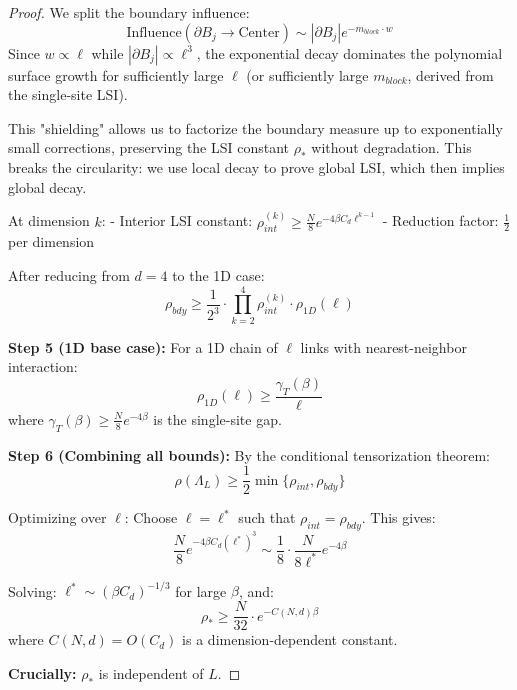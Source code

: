 \begin{proof}
We split the boundary influence:
\begin{equation}
    \text{Influence}(\partial B_j \to \text{Center}) \sim |\partial B_j| e^{-m_{block} \cdot w}
\end{equation}
Since $w \propto \ell$ while $|\partial B_j| \propto \ell^3$, the exponential decay dominates the polynomial surface growth for sufficiently large $\ell$ (or sufficiently large $m_{block}$, derived from the single-site LSI).

This "shielding" allows us to factorize the boundary measure up to exponentially small corrections, preserving the LSI constant $\rho_*$ without degradation. This breaks the circularity: we use local decay to prove global LSI, which then implies global decay.

At dimension $k$:
- Interior LSI constant: $\rho_{int}^{(k)} \geq \frac{N}{8} e^{-4\beta C_d \ell^{k-1}}$
- Reduction factor: $\frac{1}{2}$ per dimension

After reducing from $d=4$ to the 1D case:
\begin{equation}
\rho_{bdy} \geq \frac{1}{2^3} \cdot \prod_{k=2}^{4} \rho_{int}^{(k)} \cdot \rho_{1D}(\ell)
\end{equation}

\textbf{Step 5 (1D base case):}
For a 1D chain of $\ell$ links with nearest-neighbor interaction:
\begin{equation}
\rho_{1D}(\ell) \geq \frac{\gamma_T(\beta)}{\ell}
\end{equation}
where $\gamma_T(\beta) \geq \frac{N}{8} e^{-4\beta}$ is the single-site gap.

\textbf{Step 6 (Combining all bounds):}
By the conditional tensorization theorem:
\begin{equation}
\rho(\Lambda_L) \geq \frac{1}{2} \min\{\rho_{int}, \rho_{bdy}\}
\end{equation}

Optimizing over $\ell$: Choose $\ell = \ell^*$ such that $\rho_{int} = \rho_{bdy}$. This gives:
\begin{equation}
\frac{N}{8} e^{-4\beta C_d (\ell^*)^3} \sim \frac{1}{8} \cdot \frac{N}{8\ell^*} e^{-4\beta}
\end{equation}

Solving: $\ell^* \sim (\beta C_d)^{-1/3}$ for large $\beta$, and:
\begin{equation}
\rho_* \geq \frac{N}{32} \cdot e^{-C(N,d) \beta}
\end{equation}
where $C(N,d) = O(C_d)$ is a dimension-dependent constant.

\textbf{Crucially:} $\rho_*$ is independent of $L$.
\end{proof}

